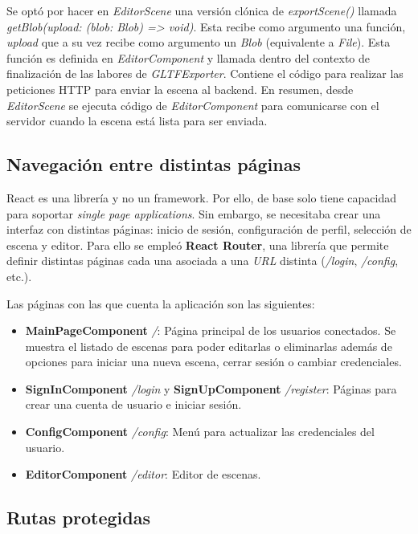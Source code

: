 Se optó por hacer en \textit{EditorScene} una versión clónica de \textit{exportScene()} llamada \textit{getBlob(upload: (blob: Blob) => void)}. Esta recibe como argumento una función, \textit{upload} que a su vez recibe como argumento un \textit{Blob} (equivalente a \textit{File}). Esta función es definida en \textit{EditorComponent} y llamada dentro del contexto de finalización de las labores de \textit{GLTFExporter}. Contiene el código para realizar las peticiones HTTP para enviar la escena al backend. En resumen, desde \textit{EditorScene} se ejecuta código de \textit{EditorComponent} para comunicarse con el servidor cuando la escena está lista para ser enviada.

\subsection{Navegación entre distintas páginas}

React es una librería y no un framework. Por ello, de base solo tiene capacidad para soportar \textit{single page applications}. Sin embargo, se necesitaba crear una interfaz con distintas páginas: inicio de sesión, configuración de perfil, selección de escena y editor. Para ello se empleó \textbf{React Router}\cite{reactrouter}, una librería que permite definir distintas páginas cada una asociada a una \textit{URL} distinta (\textit{/login}, \textit{/config}, etc.).

Las páginas con las que cuenta la aplicación son las siguientes:

\begin{itemize}
    \item \textbf{MainPageComponent} \textit{/}: Página principal de los usuarios conectados. Se muestra el listado de escenas para poder editarlas o eliminarlas además de opciones para iniciar una nueva escena, cerrar sesión o cambiar credenciales.
    \item \textbf{SignInComponent} \textit{/login} y \textbf{SignUpComponent} \textit{/register}: Páginas para crear una cuenta de usuario e iniciar sesión.
    \item \textbf{ConfigComponent} \textit{/config}: Menú para actualizar las credenciales del usuario.
    \item \textbf{EditorComponent} \textit{/editor}: Editor de escenas.
\end{itemize}

\subsection{Rutas protegidas}

